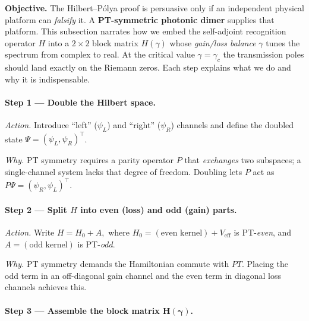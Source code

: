 \documentclass[11pt]{article}
\begin{document}
\noindent
\textbf{Objective.}\;
The Hilbert–Pólya proof is persuasive only if an independent physical
platform can \emph{falsify} it.  
A \textbf{PT-symmetric photonic dimer} supplies that platform.
This subsection narrates how we embed the self-adjoint recognition
operator \(H\) into a $2\times2$ block matrix
\(H(\gamma)\) whose \emph{gain/loss balance} \(\gamma\) tunes the
spectrum from complex to real.  
At the critical value \(\gamma=\gamma_{c}\) the transmission poles
should land exactly on the Riemann zeros.  
Each step explains what we do and why it is indispensable.

\vspace{0.6em}
\paragraph{Step 1 — Double the Hilbert space.}

\emph{Action.}  
Introduce “left” ($\psi_{L}$) and “right” ($\psi_{R}$) channels and
define the doubled state
\(\Psi=(\psi_{L},\psi_{R})^{\!\top}\).

\emph{Why.}  
PT symmetry requires a parity operator $P$ that \emph{exchanges} two
subspaces; a single-channel system lacks that degree of freedom.
Doubling lets $P$ act as
\(
  P\Psi=(\psi_{R},\psi_{L})^{\!\top}.
\)

\vspace{0.4em}
\paragraph{Step 2 — Split $H$ into even (loss) and odd (gain) parts.}

\emph{Action.}  
Write
\(
   H = H_{0}+A,
\)
where  
\(H_{0}=(\text{even kernel}) + V_{\mathrm{eff}}\)  
is PT-\emph{even},  
and \(A=(\text{odd kernel})\) is PT-\emph{odd}.

\emph{Why.}  
PT symmetry demands the Hamiltonian commute with $PT$.  
Placing the odd term in an off-diagonal gain channel
and the even term in diagonal loss channels achieves this.

\vspace{0.4em}
\paragraph{Step 3 — Assemble the block matrix \(\boldsymbol{H(\gamma)}\).}
\end{document}
